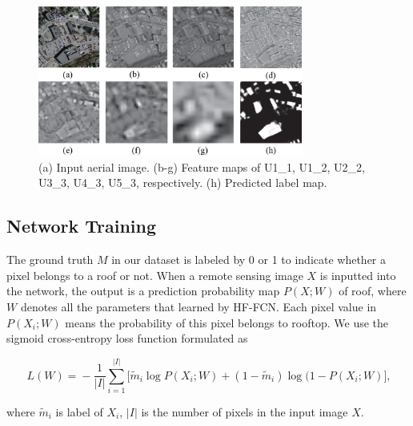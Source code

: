 \begin{figure}
\centering
\includegraphics[width=8.7cm]{Figures/feature_maps.eps}
\caption{(a) Input aerial image. (b-g) Feature maps of U1\_1, U1\_2, U2\_2, U3\_3, U4\_3, U5\_3, respectively. (h) Predicted label map.}
\label{fig:feature_maps}
\end{figure}


\subsection{Network Training}

The ground truth $M$ in our dataset is labeled by 0 or 1 to indicate whether a pixel belongs to a roof or not. 
When a remote sensing image ${X}$ is inputted into the network, the output is a prediction probability map $P(X;W)$ of roof, where $W$ denotes all the parameters that learned by HF-FCN. Each pixel value in $P(X_{i};W)$ means the probability of this pixel belongs to rooftop.
We use the sigmoid cross-entropy loss function formulated as
\begin{small}
\begin{equation}
     \label{loss}
     \ L(W)\! =\! -\frac{1}{\vert I\vert}\sum_{i=1}^{\vert I \vert}\lbrack{\tilde{m}_i \log{P(X_{i};W)}\!+\!(1\!-\!\tilde{m}_i)\log(1\!-\!P(X_{i};W)}\rbrack,
\end{equation}
\end{small}
where $\tilde{m}_i$ is label of $X_{i}$, ${\vert I\vert}$ is the number of pixels in the input image ${X}$.
